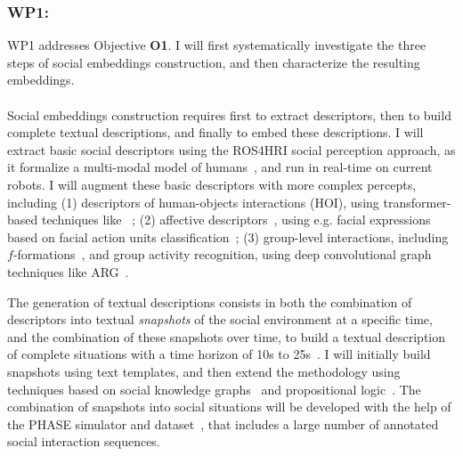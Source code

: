 \subsubsection{WP1: \textbf{\WPA}}

WP1 addresses Objective \textbf{O1}. I will first systematically investigate the
three steps of social embeddings construction, and then characterize the
resulting embeddings.


\paragraph{\TAA}

Social embeddings construction requires first to extract descriptors, then to
build complete textual descriptions, and finally to embed these descriptions.  I
will extract basic social descriptors using the ROS4HRI social perception
approach, as it formalize a multi-modal model of humans~\cite{lemaignan2022ros},
and run in real-time on current robots. I will augment these basic descriptors
with more complex percepts, including (1) descriptors of human-objects
interactions (HOI), using transformer-based techniques
like~\cite{iftekhar2022what} ; (2) affective
descriptors~\cite{vinciarelli2009social}, using e.g. facial expressions based on
facial action units classification~\cite{martinez2019automatic}; (3) group-level
interactions, including $f$-formations~\cite{setti2015fformation}, and group
activity recognition, using deep convolutional graph techniques like
ARG~\cite{wu2019learning}.


The generation of textual descriptions consists in both the combination of
descriptors into textual \emph{snapshots} of the social environment at a
specific time, and the combination of these snapshots over time, to build a
textual description of complete situations with a time horizon of 10s to
25s~\cite{netanyahu2021phase}. I will initially build snapshots using text
templates, and then extend the methodology using techniques based on
social knowledge graphs~\cite{sap2019atomic} and propositional
logic~\cite{tsoi2022sean}. The combination of snapshots into social situations
will be developed with the help of the PHASE simulator and
dataset~\cite{netanyahu2021phase}, that includes a large number of annotated
social interaction sequences.

